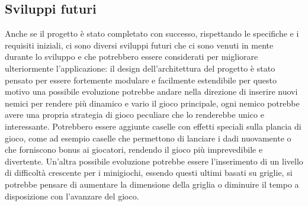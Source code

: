 \subsection{Sviluppi futuri} \label{sec:retrospective-future-developments}
Anche se il progetto è stato completato con successo, rispettando le specifiche e i requisiti iniziali, ci sono
diversi sviluppi futuri che ci sono venuti in mente durante lo sviluppo e che potrebbero essere considerati
per migliorare ulteriormente l'applicazione: il design dell'architettura del progetto è stato pensato per essere
fortemente modulare e facilmente estendibile per questo motivo una possibile evoluzione potrebbe andare nella direzione
di inserire nuovi nemici per rendere più dinamico e vario il gioco principale, ogni nemico potrebbe avere una propria strategia 
di gioco peculiare che lo renderebbe unico e interessante. Potrebbero essere aggiunte caselle con effetti speciali 
sulla plancia di gioco, come ad esempio caselle che permettono di lanciare i dadi nuovamente o che forniscono bonus
ai giocatori, rendendo il gioco più imprevedibile e divertente. Un'altra possibile evoluzione
potrebbe essere l'inserimento di un livello di difficoltà crescente per i minigiochi, essendo questi ultimi basati su griglie,
si potrebbe pensare di aumentare la dimensione della griglia o diminuire il tempo a disposizione con l'avanzare del gioco.